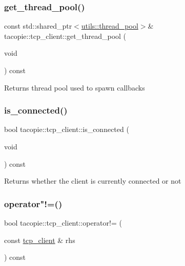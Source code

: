 \subsubsection{\texorpdfstring{get\+\_\+thread\+\_\+pool()}{get\_thread\_pool()}}
{\footnotesize\ttfamily const std\+::shared\+\_\+ptr$<$\hyperlink{classtacopie_1_1utils_1_1thread__pool}{utils\+::thread\+\_\+pool}$>$\& tacopie\+::tcp\+\_\+client\+::get\+\_\+thread\+\_\+pool (\begin{DoxyParamCaption}\item[{void}]{ }\end{DoxyParamCaption}) const}

\begin{DoxyReturn}{Returns}
thread pool used to spawn callbacks 
\end{DoxyReturn}
\mbox{\label{classtacopie_1_1tcp__client_a9bf568812c8350260843842e7952c8c3}} 
\subsubsection{\texorpdfstring{is\+\_\+connected()}{is\_connected()}}
{\footnotesize\ttfamily bool tacopie\+::tcp\+\_\+client\+::is\+\_\+connected (\begin{DoxyParamCaption}\item[{void}]{ }\end{DoxyParamCaption}) const}

\begin{DoxyReturn}{Returns}
whether the client is currently connected or not 
\end{DoxyReturn}
\mbox{\label{classtacopie_1_1tcp__client_af352b6b1e939c919aec2761517051eb9}} 
\subsubsection{\texorpdfstring{operator"!=()}{operator!=()}}
{\footnotesize\ttfamily bool tacopie\+::tcp\+\_\+client\+::operator!= (\begin{DoxyParamCaption}\item[{const \hyperlink{classtacopie_1_1tcp__client}{tcp\+\_\+client} \&}]{rhs }\end{DoxyParamCaption}) const}

